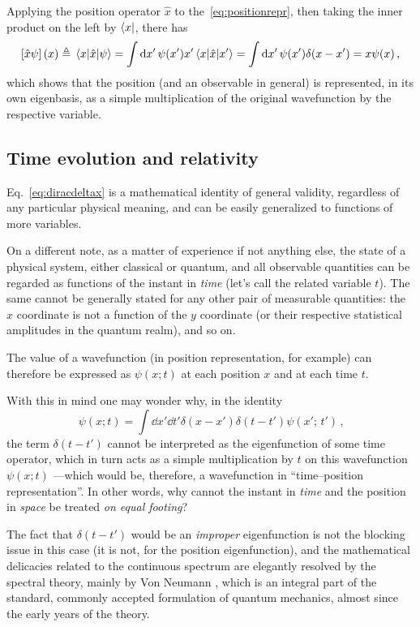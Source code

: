 Applying the position operator $\hat{x}$ to the~\eqref{eq:positionrepr},
then taking the inner product on the left by $\bra{x}$,
there has
\begin{equation}
  \qty[\hat{x}\psi](x) \triangleq \mel{x}{\hat{x}}{\psi} =
    \int \dd{x'} \psi(x') x' \mel{x}{\hat{x}}{x'} =
    \int \dd{x'} \psi(x') \delta(x-x') =
    x\psi(x)
  \,\text{,}
\end{equation}
which
shows that the position
(and an observable in general) is represented, in its own eigenbasis,
as a simple multiplication of the original wavefunction by the respective variable.

\subsection{Time evolution and relativity}

Eq.~\eqref{eq:diracdeltax} is a mathematical identity
of general validity,
regardless of any particular physical meaning,
and can be easily generalized to functions
of more variables.

On a different note, as a matter of experience if not anything else,
the state of a physical system, either classical or quantum,
and all observable quantities
can be regarded as functions of the instant in \emph{time}
(let's call the related variable $t$).
The same cannot be generally stated for any other pair of measurable quantities:
the $x$ coordinate is not a function of the $y$ coordinate
(or their respective statistical amplitudes in the quantum realm),
and so on.

The value of a wavefunction (in position representation, for example)
can therefore be expressed as $\psi(x; t)$ at each position $x$
and at each time $t$.

With this in mind one may wonder why, in the identity
\begin{equation}\label{eq:diracdeltaxt}
  \psi(x; t) = \int \dd{x'}\dd{t'} \delta(x-x')\delta(t-t') \psi(x';\, t') \,\text{,}
\end{equation}
the term $\delta(t-t')$ cannot be interpreted as the eigenfunction of some time operator,
which in turn acts as a simple multiplication by $t$ on this
wavefunction $\psi(x; t)$ ---which would be, therefore, a wavefunction in ``time--position representation''.
In other words, why cannot the instant in \emph{time} and the position in \emph{space} be treated
\emph{on equal footing}?

The fact that $\delta(t-t')$ would be an \emph{improper} eigenfunction
is not the blocking issue in this case (it is not, for the position eigenfunction),
and the mathematical delicacies related to the continuous spectrum are
elegantly resolved by the spectral theory, mainly by Von Neumann
\parencite{VonNeumann}, which is an integral part of the standard, commonly accepted
formulation of quantum mechanics, almost since the early years of the theory.

